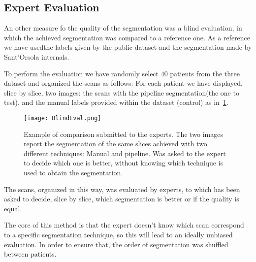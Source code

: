 \documentclass{standalone}
\begin{document}
	\subsection{Expert Evaluation}
	
	An other measure fo the quality of the segmentation was a blind evaluation, in which the achieved segmentation was compared to a reference one. As a reference we have usedthe labels given by the public dataset and the segmentation made by Sant'Orsola internals. 
	
	To perform the evaluation  we have randomly select $40$ patients from the three dataset and organized the scans as follows:
	For each patient we have displayed, slice by slice,  two images: the scans with the pipeline segmentation(the one to test), and the manual labels provided within the dataset (control) as in \figurename\,\ref{fig:Blind}.
	
	\begin{figure}[h!]
		\centering
			\texttt{[image: BlindEval.png]}
			\caption{Example of comparison submitted to the experts. The two images report the segmentation of the same slices achieved with two different techniques: Manual and pipeline. Was asked to the expert to decide which one is better, without knowing which technique is used to obtain the segmentation.}\label{fig:Blind}
	\end{figure}

	The scans, organized in this way, was evaluated by experts, to which has been asked to decide, slice by slice, which segmentation is better or if the quality is equal.
	
	The core of this method is that the expert doesn't know which scan correspond to a specific segmentation technique, so this will lead to an ideally unbiased evaluation.  In order to ensure that, the order of segmentation was shuffled between patients. 
	
	

	
\end{document}
